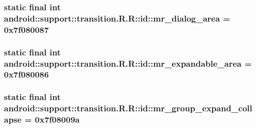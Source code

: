 \hypertarget{classandroid_1_1support_1_1transition_1_1_r_1_1id_4e5d2bfb10e4e85c429e69b92b5b3d19}{
\subsubsection[{mr\_\-dialog\_\-area}]{\setlength{\rightskip}{0pt plus 5cm}static final int android::support::transition.R.R::id::mr\_\-dialog\_\-area = 0x7f080087}}
\label{classandroid_1_1support_1_1transition_1_1_r_1_1id_4e5d2bfb10e4e85c429e69b92b5b3d19}


\hypertarget{classandroid_1_1support_1_1transition_1_1_r_1_1id_60508be029fdc3005b5ddfa5a7b76167}{
\subsubsection[{mr\_\-expandable\_\-area}]{\setlength{\rightskip}{0pt plus 5cm}static final int android::support::transition.R.R::id::mr\_\-expandable\_\-area = 0x7f080086}}
\label{classandroid_1_1support_1_1transition_1_1_r_1_1id_60508be029fdc3005b5ddfa5a7b76167}


\hypertarget{classandroid_1_1support_1_1transition_1_1_r_1_1id_dcd2083ad260ff1fa6909f9563dd8ce3}{
\subsubsection[{mr\_\-group\_\-expand\_\-collapse}]{\setlength{\rightskip}{0pt plus 5cm}static final int android::support::transition.R.R::id::mr\_\-group\_\-expand\_\-collapse = 0x7f08009a}}
\label{classandroid_1_1support_1_1transition_1_1_r_1_1id_dcd2083ad260ff1fa6909f9563dd8ce3}


